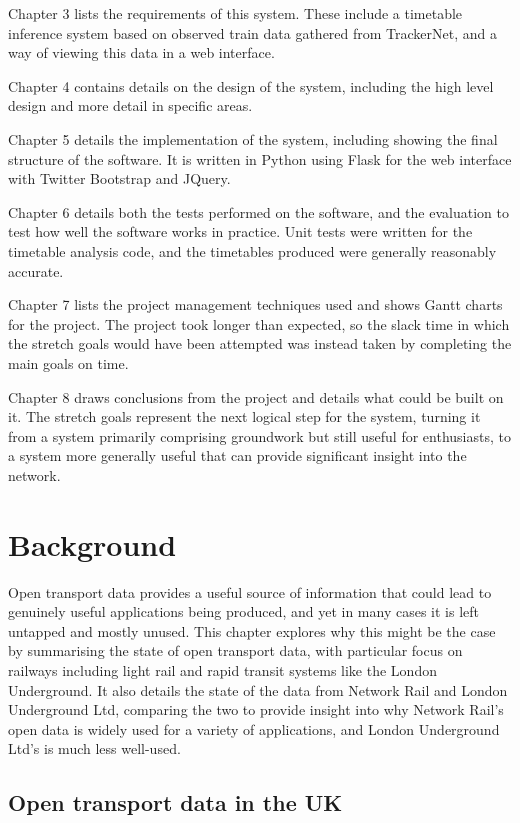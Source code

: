 \documentclass[a4paper,12pt,twoside]{report}
\begin{document}
Chapter 3 lists the requirements of this system. These include a timetable
inference system based on observed train data gathered from TrackerNet, and a
way of viewing this data in a web interface.

Chapter 4 contains details on the design of the system, including the high
level design and more detail in specific areas.

Chapter 5 details the implementation of the system, including showing the final
structure of the software. It is written in Python using Flask for the web
interface with Twitter Bootstrap and JQuery.

Chapter 6 details both the tests performed on the software, and the evaluation
to test how well the software works in practice. Unit tests were written for
the timetable analysis code, and the timetables produced were generally
reasonably accurate.

Chapter 7 lists the project management techniques used and shows Gantt charts
for the project. The project took longer than expected, so the slack time in
which the stretch goals would have been attempted was instead taken by
completing the main goals on time.

Chapter 8 draws conclusions from the project and details what could be built on
it. The stretch goals represent the next logical step for the system, turning
it from a system primarily comprising groundwork but still useful for
enthusiasts, to a system more generally useful that can provide significant
insight into the network.

\chapter{Background}

Open transport data provides a useful source of information that could lead to
genuinely useful applications being produced, and yet in many cases it is left
untapped and mostly unused. This chapter explores why this might be the case by
summarising the state of open transport data, with particular focus on railways
including light rail and rapid transit systems like the London Underground. It
also details the state of the data from Network Rail and London Underground
Ltd, comparing the two to provide insight into why Network Rail's open data is
widely used for a variety of applications, and London Underground Ltd's is much
less well-used.

\section{Open transport data in the UK}
\end{document}
